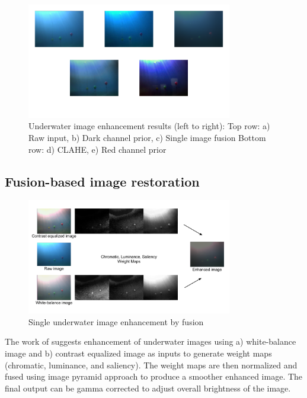 \documentclass[hyp]{socreport}
\begin{document}
\begin{figure}[H]
\centering
  \includegraphics[width=0.8\textwidth, height=0.3\textheight]{enhancement_results.png}
  \caption{Underwater image enhancement results (left to right): \newline Top row:
  a) Raw input, b) Dark channel prior, c) Single image fusion \newline Bottom
  row: d) CLAHE, e) Red channel prior}
  \label{fig:underwater_image_enhancement_results}
\end{figure}

\subsection{Fusion-based image restoration}

\begin{figure}[H]
\centering
  \includegraphics[width=0.8\textwidth, height=0.3\textheight]{fusion_pipeline.png}
  \caption{Single underwater image enhancement by fusion}
  \label{fig:fusion_pipeline}
\end{figure}

The work of  suggests enhancement of underwater
images using a) white-balance image and b) contrast equalized image as inputs to
generate weight maps (chromatic, luminance, and saliency). The weight maps are
then normalized and fused using image pyramid approach to produce a smoother
enhanced image. The final output can be gamma corrected to adjust overall
brightness of the image.
\end{document}
